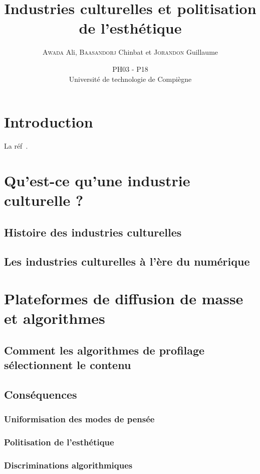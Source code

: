 \documentclass[a4paper,12pt]{report}
\title{Industries culturelles et politisation de l'esthétique}
\author{\textsc{Awada} Ali, \textsc{Baasandorj} Chinbat et \textsc{Jorandon} Guillaume}
\date{PH03 - P18\\ Université de technologie de Compiègne\\\vspace{1cm}}
\begin{document}
\maketitle

\tableofcontents

\chapter*{Introduction}

La réf~\cite{wow_pandemic}.

\chapter{Qu'est-ce qu'une industrie culturelle ?}

\section{Histoire des industries culturelles}

\section{Les industries culturelles à l'ère du numérique}

\chapter{Plateformes de diffusion de masse et algorithmes}

\section{Comment les algorithmes de profilage sélectionnent le contenu}

\section{Conséquences}

\subsection{Uniformisation des modes de pensée}

\subsection{Politisation de l'esthétique}

\subsection{Discriminations algorithmiques}
\end{document}
